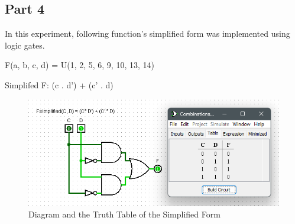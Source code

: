 \documentclass[pdftex,12pt,a4paper]{article}
\begin{document}
\subsection{Part 4}
In this experiment, following function's simplified form was implemented using logic gates.

F(a, b, c, d) = U(1, 2, 5, 6, 9, 10, 13, 14)

Simplifed F: (c . d') + (c' . d)

\begin{figure}[H]
	\centering
	\includegraphics[width=1\textwidth]{ex4.png}
	\caption{Diagram and the Truth Table of the Simplified Form}
	\label{fig4}
\end{figure}
\end{document}
